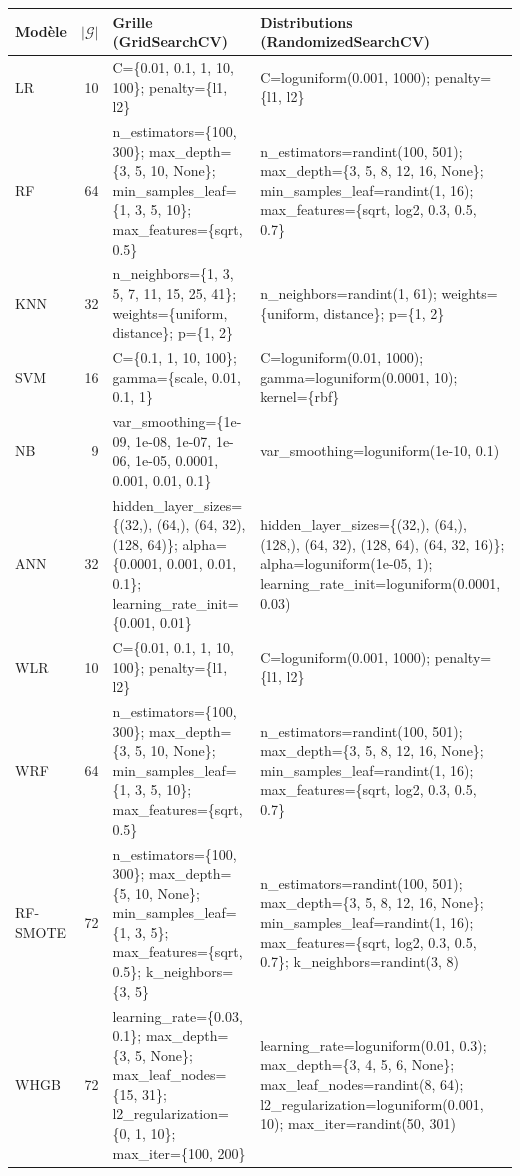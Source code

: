 \begin{tabular}{lrp{6.4cm}p{6.4cm}}
\toprule
Modèle & $|\mathcal G|$ & Grille (GridSearchCV) & Distributions (RandomizedSearchCV) \\
\midrule
LR & 10 & \scriptsize C=\{0.01, 0.1, 1, 10, 100\}; penalty=\{l1, l2\} & \scriptsize C=loguniform(0.001, 1000); penalty=\{l1, l2\} \\
RF & 64 & \scriptsize n\_estimators=\{100, 300\}; max\_depth=\{3, 5, 10, None\}; min\_samples\_leaf=\{1, 3, 5, 10\}; max\_features=\{sqrt, 0.5\} & \scriptsize n\_estimators=randint(100, 501); max\_depth=\{3, 5, 8, 12, 16, None\}; min\_samples\_leaf=randint(1, 16); max\_features=\{sqrt, log2, 0.3, 0.5, 0.7\} \\
KNN & 32 & \scriptsize n\_neighbors=\{1, 3, 5, 7, 11, 15, 25, 41\}; weights=\{uniform, distance\}; p=\{1, 2\} & \scriptsize n\_neighbors=randint(1, 61); weights=\{uniform, distance\}; p=\{1, 2\} \\
SVM & 16 & \scriptsize C=\{0.1, 1, 10, 100\}; gamma=\{scale, 0.01, 0.1, 1\} & \scriptsize C=loguniform(0.01, 1000); gamma=loguniform(0.0001, 10); kernel=\{rbf\} \\
NB & 9 & \scriptsize var\_smoothing=\{1e-09, 1e-08, 1e-07, 1e-06, 1e-05, 0.0001, 0.001, 0.01, 0.1\} & \scriptsize var\_smoothing=loguniform(1e-10, 0.1) \\
ANN & 32 & \scriptsize hidden\_layer\_sizes=\{(32,), (64,), (64, 32), (128, 64)\}; alpha=\{0.0001, 0.001, 0.01, 0.1\}; learning\_rate\_init=\{0.001, 0.01\} & \scriptsize hidden\_layer\_sizes=\{(32,), (64,), (128,), (64, 32), (128, 64), (64, 32, 16)\}; alpha=loguniform(1e-05, 1); learning\_rate\_init=loguniform(0.0001, 0.03) \\
WLR & 10 & \scriptsize C=\{0.01, 0.1, 1, 10, 100\}; penalty=\{l1, l2\} & \scriptsize C=loguniform(0.001, 1000); penalty=\{l1, l2\} \\
WRF & 64 & \scriptsize n\_estimators=\{100, 300\}; max\_depth=\{3, 5, 10, None\}; min\_samples\_leaf=\{1, 3, 5, 10\}; max\_features=\{sqrt, 0.5\} & \scriptsize n\_estimators=randint(100, 501); max\_depth=\{3, 5, 8, 12, 16, None\}; min\_samples\_leaf=randint(1, 16); max\_features=\{sqrt, log2, 0.3, 0.5, 0.7\} \\
RF-SMOTE & 72 & \scriptsize n\_estimators=\{100, 300\}; max\_depth=\{5, 10, None\}; min\_samples\_leaf=\{1, 3, 5\}; max\_features=\{sqrt, 0.5\}; k\_neighbors=\{3, 5\} & \scriptsize n\_estimators=randint(100, 501); max\_depth=\{3, 5, 8, 12, 16, None\}; min\_samples\_leaf=randint(1, 16); max\_features=\{sqrt, log2, 0.3, 0.5, 0.7\}; k\_neighbors=randint(3, 8) \\
WHGB & 72 & \scriptsize learning\_rate=\{0.03, 0.1\}; max\_depth=\{3, 5, None\}; max\_leaf\_nodes=\{15, 31\}; l2\_regularization=\{0, 1, 10\}; max\_iter=\{100, 200\} & \scriptsize learning\_rate=loguniform(0.01, 0.3); max\_depth=\{3, 4, 5, 6, None\}; max\_leaf\_nodes=randint(8, 64); l2\_regularization=loguniform(0.001, 10); max\_iter=randint(50, 301) \\
\bottomrule
\end{tabular}